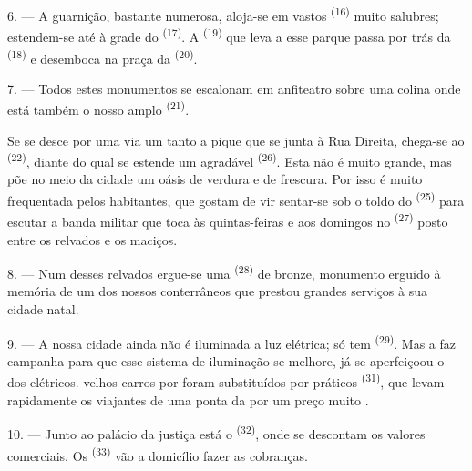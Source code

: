 \VUsaut{5.0mm}
\VUsaut{3.4mm}

6. --- A guarnição, bastante numerosa, aloja-se em vastos
 \textsuperscript{(16)} muito salubres; estendem-se até à grade do
 \textsuperscript{(17)}. A 
\textsuperscript{(19)} que leva a esse parque passa por trás da  \textsuperscript{(18)} e desemboca na praça da 
\textsuperscript{(20)}.

7. --- Todos estes monumentos se escalonam em anfiteatro sobre uma colina
onde está também o nosso amplo  \textsuperscript{(21)}.

Se se desce por uma via um tanto a pique que se junta à Rua Direita,
chega-se ao  \textsuperscript{(22)}, diante do qual se
estende um agradável  \textsuperscript{(26)}. Esta
 não é muito grande, mas põe no meio da cidade um
oásis de verdura e de frescura. Por isso é muito frequentada pelos
habitantes, que gostam de vir sentar-se sob o toldo do 
\textsuperscript{(25)} para escutar a banda militar que toca às quintas-feiras e
aos domingos no  \textsuperscript{(27)} posto entre os relvados e os
maciços.

8. --- Num desses relvados ergue-se uma  \textsuperscript{(28)} de
bronze, monumento erguido à memória de um dos nossos conterrâneos que
prestou grandes serviços à sua cidade natal.

\VUsaut{4.0mm}
\VUsaut{3.4mm}

9. --- A nossa cidade ainda não é iluminada a luz elétrica; só tem
 \textsuperscript{(29)}. Mas a  faz
campanha para que esse sistema de iluminação se melhore, 
já se aperfeiçoou o  dos elétricos. 
velhos carros  por  foram substituídos por
práticos  \textsuperscript{(31)}, que levam rapidamente os
viajantes de uma ponta da  por um preço muito
.

10. --- Junto ao palácio da justiça está o  \textsuperscript{(32)},
onde se descontam os valores comerciais. Os 
\textsuperscript{(33)} vão a domicílio fazer as cobranças.

